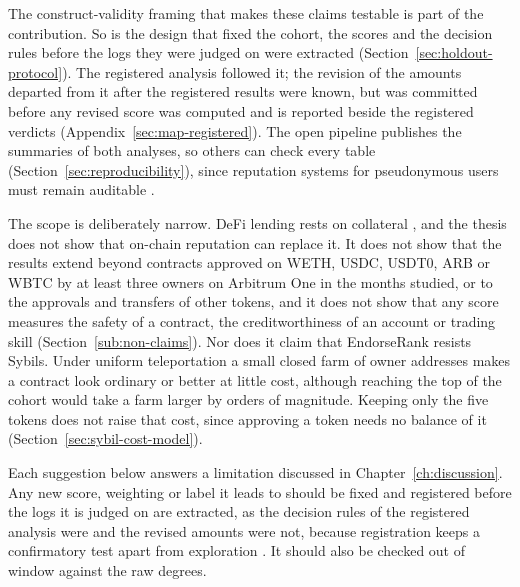 The construct-validity framing \parencite{cronbach1955construct} that makes these claims testable is part of the contribution. So is the design that fixed the cohort, the scores and the decision rules before the logs they were judged on were extracted (Section~\ref{sec:holdout-protocol}). The registered analysis followed it; the revision of the amounts departed from it after the registered results were known, but was committed before any revised score was computed and is reported beside the registered verdicts (Appendix~\ref{sec:map-registered}). The open pipeline publishes the summaries of both analyses, so others can check every table (Section~\ref{sec:reproducibility}), since reputation systems for pseudonymous users must remain auditable \parencite{packin2024credit}.

The scope is deliberately narrow. DeFi lending rests on collateral \parencite{schar2021defi}, and the thesis does not show that on-chain reputation can replace it. It does not show that the results extend beyond contracts approved on WETH, USDC, USDT0, ARB or WBTC by at least three owners on Arbitrum One in the months studied, or to the approvals and transfers of other tokens, and it does not show that any score measures the safety of a contract, the creditworthiness of an account or trading skill (Section~\ref{sub:non-claims}). Nor does it claim that EndorseRank resists Sybils. Under uniform teleportation a small closed farm of owner addresses makes a contract look ordinary or better at little cost, although reaching the top of the cohort would take a farm larger by orders of magnitude. Keeping only the five tokens does not raise that cost, since approving a token needs no balance of it (Section~\ref{sec:sybil-cost-model}).


Each suggestion below answers a limitation discussed in Chapter~\ref{ch:discussion}. Any new score, weighting or label it leads to should be fixed and registered before the logs it is judged on are extracted, as the decision rules of the registered analysis were and the revised amounts were not, because registration keeps a confirmatory test apart from exploration \parencite{nosek2018preregistration}. It should also be checked out of window against the raw degrees.

